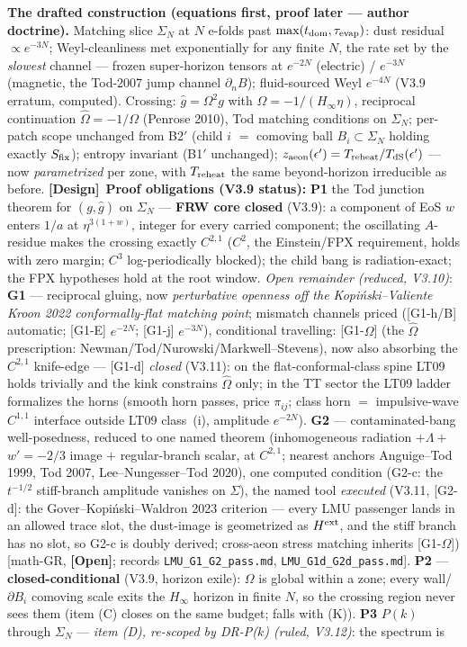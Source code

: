 \documentclass[11pt]{article}
\newcommand{\design}{\textcolor{blue!60!black}{\textbf{[Design]}}}
\newcommand{\open}{\textcolor{red!70!black}{\textbf{[Open]}}}
\begin{document}
\textbf{The drafted construction (equations first, proof later --- author doctrine).} Matching slice $\Sigma_N$ at $N$ e-folds past $\max(t_{\rm dom},\tau_{\rm evap})$: dust residual $\propto e^{-3N}$; Weyl-cleanliness met exponentially for any finite $N$, the rate set by the \emph{slowest} channel --- frozen super-horizon tensors at $e^{-2N}$ (electric) / $e^{-3N}$ (magnetic, the Tod-2007 jump channel $\partial_n B$); fluid-sourced Weyl $e^{-4N}$ (V3.9 erratum, computed). Crossing: $\hat g=\Omega^2 g$ with $\Omega=-1/(H_\infty\eta)$, reciprocal continuation $\hat\Omega=-1/\Omega$ (Penrose 2010), Tod matching conditions on $\Sigma_N$; per-patch scope unchanged from B2$'$ (child $i$ $=$ comoving ball $B_i\subset\Sigma_N$ holding exactly $S_{\rm fix}$); entropy invariant (B1$'$ unchanged); $z_{\rm aeon}(\epsilon')=T_{\rm reheat}/T_{\rm dS}(\epsilon')$ --- now \emph{parametrized} per zone, with $T_{\rm reheat}$ the same beyond-horizon irreducible as before. \design\ \textbf{Proof obligations (V3.9 status):} \textbf{P1} the Tod junction theorem for $(g,\hat g)$ on $\Sigma_N$ --- \textbf{FRW core closed} (V3.9): a component of EoS $w$ enters $1/a$ at $\eta^{3(1+w)}$, integer for every carried component; the oscillating $A$-residue makes the crossing exactly $C^{2,1}$ ($C^2$, the Einstein/FPX requirement, holds with zero margin; $C^3$ log-periodically blocked); the child bang is radiation-exact; the FPX hypotheses hold at the root window. \emph{Open remainder (reduced, V3.10)}: \textbf{G1} --- reciprocal gluing, now \emph{perturbative openness off the Kopi\'nski--Valiente Kroon 2022 conformally-flat matching point}; mismatch channels priced ([G1-h/B] automatic; [G1-E] $e^{-2N}$; [G1-j] $e^{-3N}$), conditional travelling: [G1-$\Omega$] (the $\hat\Omega$ prescription: Newman/Tod/Nurowski/Markwell--Stevens), now also absorbing the $C^{2,1}$ knife-edge --- [G1-d] \emph{closed} (V3.11): on the flat-conformal-class spine LT09 holds trivially and the kink constrains $\hat\Omega$ only; in the TT sector the LT09 ladder formalizes the horns (smooth horn passes, price $\pi_{ij}$; class horn $=$ impulsive-wave $C^{1,1}$ interface outside LT09 class~(i), amplitude $e^{-2N}$). \textbf{G2} --- contaminated-bang well-posedness, reduced to one named theorem (inhomogeneous radiation $+\Lambda+$ $w'=-2/3$ image $+$ regular-branch scalar, at $C^{2,1}$; nearest anchors Anguige--Tod 1999, Tod 2007, Lee--Nungesser--Tod 2020), one computed condition (G2-c: the $t^{-1/2}$ stiff-branch amplitude vanishes on $\Sigma$), the named tool \emph{executed} (V3.11, [G2-d]: the Gover--Kopi\'nski--Waldron 2023 criterion --- every LMU passenger lands in an allowed trace slot, the dust-image is geometrized as $H^{\rm ext}$, and the stiff branch has no slot, so G2-c is doubly derived; cross-aeon stress matching inherits [G1-$\Omega$]) [math-GR, \open; records \texttt{LMU\_G1\_G2\_pass.md}, \texttt{LMU\_G1d\_G2d\_pass.md}]. \textbf{P2} --- \textbf{closed-conditional} (V3.9, horizon exile): $\Omega$ is global within a zone; every wall/$\partial B_i$ comoving scale exits the $H_\infty$ horizon in finite $N$, so the crossing region never sees them (item (C) closes on the same budget; falls with (K)). \textbf{P3} $P(k)$ through $\Sigma_N$ --- \emph{item (D), re-scoped by DR-P($k$) (ruled, V3.12)}: the spectrum is 
\end{document}
